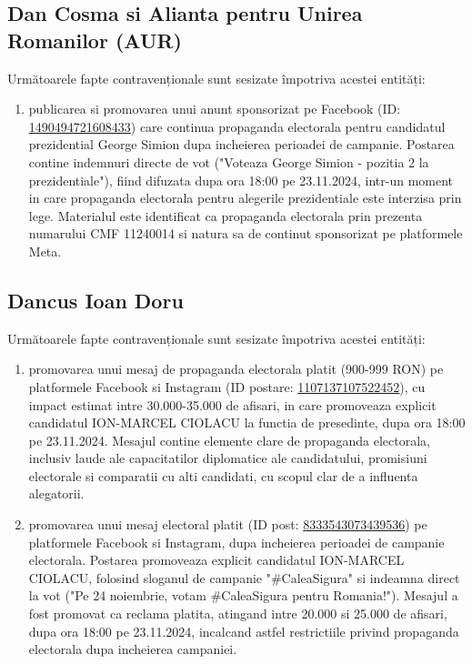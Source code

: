 \documentclass[a4paper,12pt]{article}
\begin{document}
\subsection{Dan Cosma si Alianta pentru Unirea Romanilor (AUR)}
Următoarele fapte contravenționale sunt sesizate împotriva acestei entități:

\begin{enumerate}[leftmargin=*, label=\arabic*.)]
    \item publicarea si promovarea unui anunt sponsorizat pe Facebook (ID: \href{https://www.facebook.com/ads/library/?id=1490494721608433}{1490494721608433}) care continua propaganda electorala pentru candidatul prezidential George Simion dupa incheierea perioadei de campanie. Postarea contine indemnuri directe de vot ("Voteaza George Simion - pozitia 2 la prezidentiale"), fiind difuzata dupa ora 18:00 pe 23.11.2024, intr-un moment in care propaganda electorala pentru alegerile prezidentiale este interzisa prin lege. Materialul este identificat ca propaganda electorala prin prezenta numarului CMF 11240014 si natura sa de continut sponsorizat pe platformele Meta.
\end{enumerate}

\vspace{0.5cm}

\subsection{Dancus Ioan Doru}
Următoarele fapte contravenționale sunt sesizate împotriva acestei entități:

\begin{enumerate}[leftmargin=*, label=\arabic*.)]
    \item promovarea unui mesaj de propaganda electorala platit (900-999 RON) pe platformele Facebook si Instagram (ID postare: \href{https://www.facebook.com/ads/library/?id=1107137107522452}{1107137107522452}), cu impact estimat intre 30.000-35.000 de afisari, in care promoveaza explicit candidatul ION-MARCEL CIOLACU la functia de presedinte, dupa ora 18:00 pe 23.11.2024. Mesajul contine elemente clare de propaganda electorala, inclusiv laude ale capacitatilor diplomatice ale candidatului, promisiuni electorale si comparatii cu alti candidati, cu scopul clar de a influenta alegatorii.
    \item promovarea unui mesaj electoral platit (ID post: \href{https://www.facebook.com/ads/library/?id=8333543073439536}{8333543073439536}) pe platformele Facebook si Instagram, dupa incheierea perioadei de campanie electorala. Postarea promoveaza explicit candidatul ION-MARCEL CIOLACU, folosind sloganul de campanie "\#CaleaSigura" si indeamna direct la vot ("Pe 24 noiembrie, votam \#CaleaSigura pentru Romania!"). Mesajul a fost promovat ca reclama platita, atingand intre 20.000 si 25.000 de afisari, dupa ora 18:00 pe 23.11.2024, incalcand astfel restrictiile privind propaganda electorala dupa incheierea campaniei.
\end{enumerate}
\end{document}
